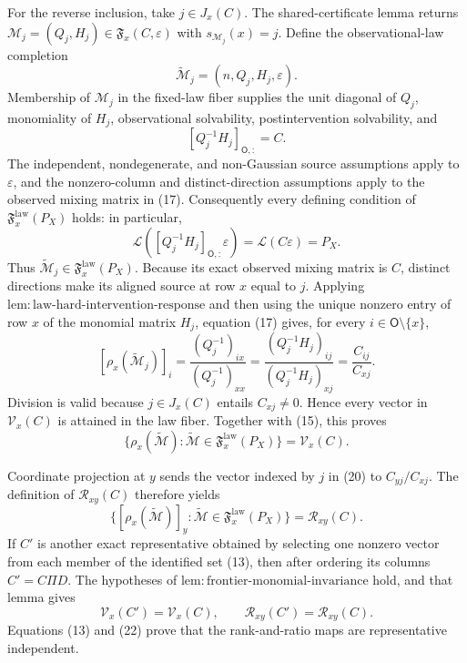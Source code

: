 For the reverse inclusion, take \(j\in J_x(C)\). The shared-certificate lemma returns \(\mathcal M_j=(Q_j,H_j)\in\mathfrak F_x(C,\varepsilon)\) with \(s_{\mathcal M_j}(x)=j\). Define the observational-law completion
\[
 \widetilde{\mathcal M}_j=(n,Q_j,H_j,\varepsilon). \tag{16}
\]
Membership of \(\mathcal M_j\) in the fixed-law fiber supplies the unit diagonal of \(Q_j\), monomiality of \(H_j\), observational solvability, postintervention solvability, and
\[
 [Q_j^{-1}H_j]_{\mathsf O,:}=C. \tag{17}
\]
The independent, nondegenerate, and non-Gaussian source assumptions apply to \(\varepsilon\), and the nonzero-column and distinct-direction assumptions apply to the observed mixing matrix in (17). Consequently every defining condition of \(\mathfrak F_x^{\mathrm{law}}(P_X)\) holds: in particular,
\[
 \mathcal L([Q_j^{-1}H_j]_{\mathsf O,:}\varepsilon)
 =\mathcal L(C\varepsilon)=P_X. \tag{18}
\]
Thus \(\widetilde{\mathcal M}_j\in\mathfrak F_x^{\mathrm{law}}(P_X)\). Because its exact observed mixing matrix is \(C\), distinct directions make its aligned source at row \(x\) equal to \(j\). Applying \(\mathrm{lem:law\text{-}hard\text{-}intervention\text{-}response}\) and then using the unique nonzero entry of row \(x\) of the monomial matrix \(H_j\), equation (17) gives, for every \(i\in\mathsf O\setminus\{x\}\),
\[
 [\rho_x(\widetilde{\mathcal M}_j)]_i
 =\frac{(Q_j^{-1})_{ix}}{(Q_j^{-1})_{xx}}
 =\frac{(Q_j^{-1}H_j)_{ij}}{(Q_j^{-1}H_j)_{xj}}
 =\frac{C_{ij}}{C_{xj}}. \tag{19}
\]
Division is valid because \(j\in J_x(C)\) entails \(C_{xj}\ne0\). Hence every vector in \(\mathcal V_x(C)\) is attained in the law fiber. Together with (15), this proves
\[
 \{\rho_x(\widetilde{\mathcal M}):\widetilde{\mathcal M}\in\mathfrak F_x^{\mathrm{law}}(P_X)\}
 =\mathcal V_x(C). \tag{20}
\]

Coordinate projection at \(y\) sends the vector indexed by \(j\) in (20) to \(C_{yj}/C_{xj}\). The definition of \(\mathcal R_{xy}(C)\) therefore yields
\[
 \{[\rho_x(\widetilde{\mathcal M})]_y:\widetilde{\mathcal M}\in\mathfrak F_x^{\mathrm{law}}(P_X)\}
 =\mathcal R_{xy}(C). \tag{21}
\]
If \(C'\) is another exact representative obtained by selecting one nonzero vector from each member of the identified set (13), then after ordering its columns \(C'=C\Pi D\). The hypotheses of \(\mathrm{lem:frontier\text{-}monomial\text{-}invariance}\) hold, and that lemma gives
\[
 \mathcal V_x(C')=\mathcal V_x(C),
 \qquad
 \mathcal R_{xy}(C')=\mathcal R_{xy}(C). \tag{22}
\]
Equations (13) and (22) prove that the rank-and-ratio maps are representative independent.

